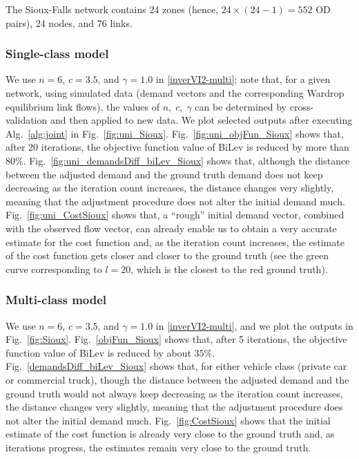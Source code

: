 \documentclass[3p]{elsarticle}
\begin{document}
The Sioux-Falls network contains 24 zones (hence, $24 \times (24 - 1) =
552$ OD pairs), 24 nodes, and 76 links.

\subsubsection*{Single-class model} 
We use $n=6$, $c = 3.5$, and $\gamma = 1.0$ in \eqref{inverVI2-multi};
note that, for a given network, using simulated data (demand vectors and
the corresponding Wardrop equilibrium link flows), the values of $n,
\;c, \;\gamma$ can be determined by cross-validation and then applied to
new data. We plot selected outputs after executing Alg.~\ref{alg:joint}
in Fig.~\ref{fig:uni_Sioux}. Fig.~\ref{fig:uni_objFun_Sioux} shows that,
after 20 iterations, the objective function value of BiLev is reduced by
more than $80\%$. Fig.~\ref{fig:uni_demandsDiff_biLev_Sioux} shows that,
although the distance between the adjusted demand and the ground truth
demand does not keep decreasing as the iteration count increases, the
distance changes very slightly, meaning that the adjustment procedure
does not alter the initial demand much. Fig.~\ref{fig:uni_CostSioux}
shows that, a ``rough'' initial demand vector, combined with the
observed flow vector, can already enable us to obtain a very accurate
estimate for the cost function and, as the iteration count increases,
the estimate of the cost function gets closer and closer to the ground
truth (see the green curve corresponding to $l=20$, which is the closest
to the red ground truth).

\subsubsection*{Multi-class model} 
We use $n=6$, $c = 3.5$, and $\gamma = 1.0$ in \eqref{inverVI2-multi},
and we plot the outputs in Fig.~\ref{fig:Sioux}. Fig.~\ref{objFun_Sioux}
shows that, after 5 iterations, the objective function value of BiLev is
reduced by about $35\%$. Fig.~\ref{demandsDiff_biLev_Sioux} shows that,
for either vehicle class (private car or commercial truck), though the
distance between the adjusted demand and the ground truth would not
always keep decreasing as the iteration count increases, the distance
changes very slightly, meaning that the adjustment procedure does not
alter the initial demand much. Fig.~\ref{fig:CostSioux} shows that the
initial estimate of the cost function is already very close to the
ground truth and, as iterations progress, the estimates remain very
close to the ground truth.
\end{document}
